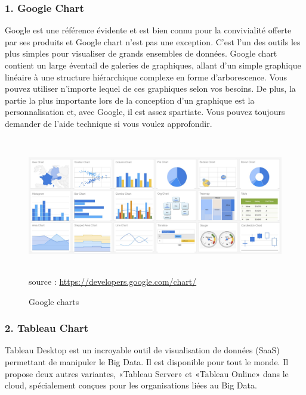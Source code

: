 \documentclass[french, a4paper, 12pt]{report}
\begin{document}
\subsubsection{1. Google Chart}
Google est une référence évidente et est bien connu pour la convivialité offerte par ses produits et Google chart n’est pas une exception. C'est l'un des outils les plus simples pour visualiser de grands ensembles de données. Google chart contient un large éventail de galeries de graphiques, allant d'un simple graphique linéaire à une structure hiérarchique complexe en forme d'arborescence. Vous pouvez utiliser n'importe lequel de ces graphiques selon vos besoins. De plus, la partie la plus importante lors de la conception d’un graphique est la personnalisation et, avec Google, il est assez spartiate. Vous pouvez toujours demander de l’aide technique si vous voulez approfondir.
\begin{figure}[!htp]
    \centering
    \includegraphics[height=6cm]{images/googlecharts.jpg}
    \scriptsize{source : \url{https://developers.google.com/chart/}}
    \caption{Google charts}
    \label{fig:2.13}
\end{figure}
\subsubsection{2. Tableau Chart}
Tableau Desktop est un incroyable outil de visualisation de données (SaaS) permettant de manipuler le Big Data. Il est disponible pour tout le monde. Il propose deux autres variantes, «Tableau Server» et «Tableau Online» dans le cloud, spécialement conçues pour les organisations liées au Big Data.
\end{document}
